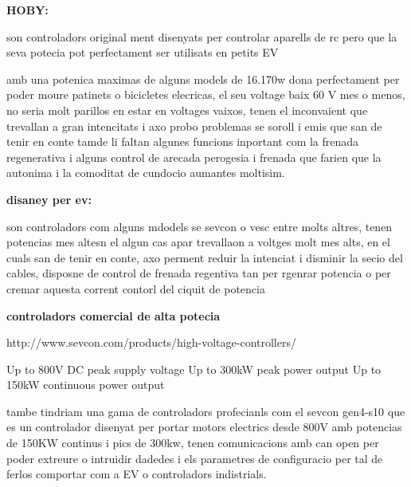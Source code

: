 \textbf{HOBY:}\smallskip

son controladors original ment disenyats per controlar aparells de rc pero que la seva potecia pot perfectament ser utilisats en petits EV \smallskip

amb una potenica maximas de alguns models de 16.170w dona perfectament per poder moure patinets o bicicletes elecricas, el seu voltage baix 60 V  mes o menos, no seria molt parillos en estar en voltages vaixos, tenen el inconvaient que trevallan a gran intencitats i axo probo problemas se soroll i emis que san de tenir en conte tamde li faltan algunes funcions inportant com la frenada regenerativa i alguns control de arecada perogesia i frenada que farien que la autonima i la comoditat de cundocio aumantes moltisim. %


\textbf{disaney per ev:}\smallskip

son controladors com alguns mdodels se sevcon o vesc entre molts altres, tenen potencias mes altesn el algun cas apar trevallaon a voltges molt mes alts, en el cuals san de tenir en conte, axo perment reduir la intenciat i disminir la secio del cables, disposne de control de frenada regentiva tan per rgenrar potencia o per cremar aquesta corrent contorl del ciquit de potencia

\textbf{controladors comercial de alta potecia}\smallskip

http://www.sevcon.com/products/high-voltage-controllers/

Up to 800V DC peak supply voltage
Up to 300kW peak power output
Up to 150kW continuous power output

tambe tindriam una gama de controladors profecianls com el sevcon gen4-s10 que es un controlador disenyat per portar motors electrics desde  800V amb potencias de 150KW continus i pics de 300kw, tenen comunicacions amb can open per poder extreure o intruidir dadedes i els parametres de configuracio per tal de ferlos comportar com a EV o controladors indistrials. 




